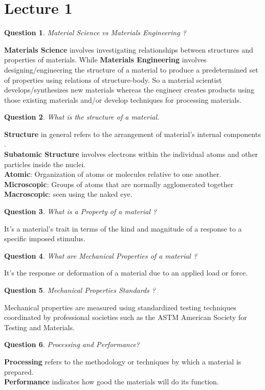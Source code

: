 \documentclass[13]{article}
\newtheorem{exer}{Question}
\begin{document}
\section{Lecture 1}
\begin{exer}
Material Science vs Materials Engineering ?
\end{exer}
\textbf{Materials Science} involves investigating relationships between structures and properties of materials. While \textbf{Materials Engineering} involves designing/engineering the structure of a material to produce a predetermined set of properties using relations of structure-body. So a material scientist   develops/synthesizes new materials whereas the engineer creates products using those existing materials and/or develop techniques for processing materials.
\begin{exer}
What is the structure of a material.
\end{exer}
\textbf{Structure} in general refers to the arrangement of material's internal components . \\
\textbf{Subatomic Structure} involves electrons within the individual atoms and other particles inside the nuclei.\\
\textbf{Atomic}: Organization of atoms or molecules relative  to one another. \\
\textbf{Microscopic}: Groups of atoms that are normally agglomerated together\\
\textbf{Macroscopic}: seen using the naked eye.
\begin{exer}
What is a Property of a material ?
\end{exer}
It's a material's trait in terms of the kind and magnitude of a response to a specific imposed stimulus. 
\begin{exer}
What are Mechanical Properties of a material ?
\end{exer}
It's the response or deformation of a material due to an applied load or force.
\begin{exer}
Mechanical Properties Standards ?
\end{exer}
Mechanical properties are measured using standardized testing
techniques coordinated by professional societies such as the ASTM American Society for Testing and Materials. 
\begin{exer}
Processing and Performance?
\end{exer}
\textbf{Processing} refers to the methodology or techniques by which a material is prepared. \\
\textbf{Performance} indicates how good the materials will do its function.
\end{document}
